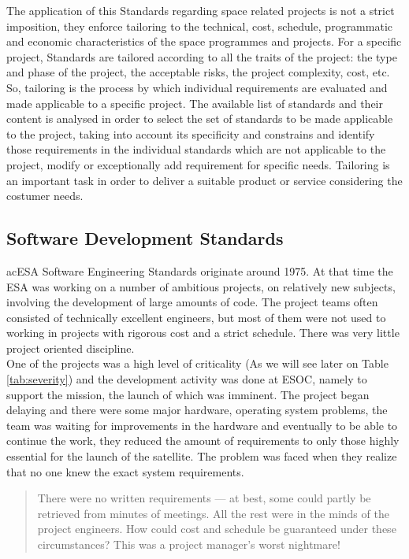 {The application of this Standards regarding space related projects is not a strict imposition, they enforce
tailoring to the technical, cost, schedule, programmatic and economic characteristics of the space programmes and projects.
For a specific project, Standards are tailored according to all the traits of the project: the type and 
phase of the project, the acceptable risks, the project complexity, cost, etc.
So, tailoring is the process by which individual requirements are evaluated and made applicable to a specific project.
The available list of standards and their content is analysed in order to select the set of standards to be made applicable to the project, taking 
into account its specificity and constrains and identify those requirements in the individual standards which are not 
applicable to the project, modify or exceptionally add requirement for specific needs\cite{ecss-s-st-00c}.
Tailoring is an important task in order to deliver a suitable product or service considering the costumer needs.\\

\subsection{Software Development Standards}
ac{ESA} Software Engineering Standards originate around 1975. At
that time the \ac{ESA} was working on a number of ambitious projects, on relatively new subjects, involving the development of
large amounts of code. The project teams often consisted of technically excellent engineers, but most of them were not used to working in projects with
rigorous cost and a strict schedule. There was very little project oriented discipline\cite{esa-bulletin-90}.\\

One of the projects was a high level of criticality (As we will see later on Table \ref{tab:severity}) and the
development activity was done at \ac{ESOC}, namely to support the mission, the launch of which was imminent.
The project began delaying and there were some major hardware, operating system problems, the team was waiting for improvements in the hardware
and eventually to be able to continue the work, they reduced the amount of requirements to only
those highly essential for the launch of the satellite. The problem was faced when they realize that no one knew the exact system requirements.
\begin{quotation}
There were no written requirements — at best, some could partly be
retrieved from minutes of meetings. All the rest were in the minds of the project engineers. How
could cost and schedule be guaranteed under these circumstances? This was a project manager's
worst nightmare!\cite{esa-bulletin-90}
\end{quotation}

}

